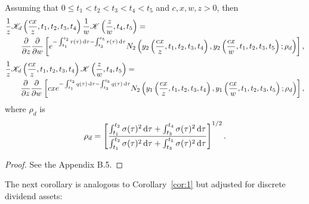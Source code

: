 \begin{lemma}
		\label{lem:B5}
		Assuming that $0 \leq t_1 < t_2 < t_3 < t_4 < t_5$ and $c,x,w,z > 0$, then
		\begin{equation}
			\label{eqn:KK3}
		\begin{split}
			&\frac{1}{z}\mathscr K_d\left(\frac{cx}{z}, t_1, t_2, t_3, t_4\right)\frac{1}{w}\mathscr K\left( \frac{z}{w}, t_4, t_5 \right) =  \\
			&\qquad \frac{\partial}{\partial z}\frac{\partial}{\partial w}\left[ e^{-\int_{t_1}^{t_2} r(\tau) \,\mathrm d\tau-\int_{t_3}^{t_5} r(\tau) \, \mathrm d\tau}  N_2\left( y_2\left(\frac{cx}{z}, t_1, t_2, t_3, t_4\right), y_2\left( \frac{cx}{w}, t_1, t_2, t_3, t_5 \right); \rho_d \right)\right],
		\end{split}
		\end{equation}
		\begin{equation}
			\label{eqn:KK4}
		\begin{split}
			&\frac{1}{z}\mathscr K_d\left(\frac{cx}{z}, t_1, t_2, t_3, t_4\right)\mathscr K\left( \frac{z}{w}, t_4, t_5 \right) =  \\
			&\qquad \frac{\partial}{\partial z}\frac{\partial}{\partial w}\left[ cxe^{-\int_{t_1}^{t_2} q(\tau) \,\mathrm d\tau-\int_{t_3}^{t_5} q(\tau) \, \mathrm d\tau}  N_2\left( y_1\left(\frac{cx}{z}, t_1, t_2, t_3, t_4\right), y_1\left( \frac{cx}{w}, t_1, t_2, t_3, t_5 \right); \rho_d \right)\right],
		\end{split}
		\end{equation}
		where $\rho_d$ is
			\begin{equation}
				\label{eqn:rhod}
				\rho_d = \left[ \frac{\int_{t_1}^{t_2} \sigma(\tau)^2 \, \mathrm d\tau + \int_{t_3}^{t_4} \sigma(\tau)^2 \, \mathrm d\tau}{\int_{t_1}^{t_2} \sigma(\tau)^2 \, \mathrm d\tau + \int_{t_3}^{t_5} \sigma(\tau)^2 \, \mathrm d\tau} \right]^{1/2}.
			\end{equation}
	\end{lemma}
	\begin{proof}
		See the Appendix B.5.
	\end{proof}
\noindent The next corollary is analogous to Corollary~\ref{cor:1} but adjusted for discrete dividend assets:
